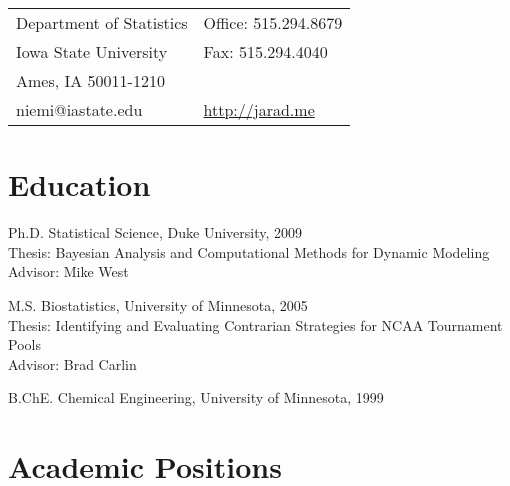 \documentclass[overlapped,line]{res}
\begin{document}

\setlength{\leftmargini}{0em}
\renewcommand{\labelitemi}{}

\renewcommand{\namefont}{\large\textbf}



\begin{resume}

\begin{tabular}{ll}
  Department of Statistics     & Office: 515.294.8679 \\
  Iowa State University                   &  Fax: \hspace{.07in} 515.294.4040 \\
  Ames, IA 50011-1210        & \\
  niemi@iastate.edu  & \url{http://jarad.me}
\end{tabular}




\section{\bf Education}
Ph.D. Statistical Science, Duke University, 2009 \\%
Thesis: Bayesian Analysis and Computational Methods for Dynamic Modeling\\
Advisor: Mike West

M.S. Biostatistics, University of Minnesota, 2005\\%
Thesis: Identifying and Evaluating Contrarian Strategies for NCAA Tournament Pools \\
Advisor: Brad Carlin

B.ChE. Chemical Engineering, University of Minnesota, 1999%



\section{\bf Academic Positions}


\end{resume}
\end{document}

